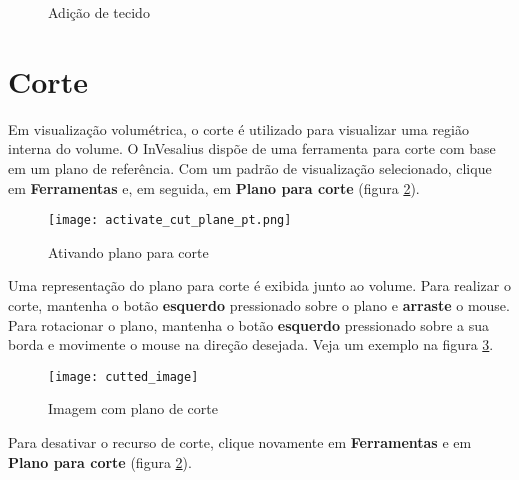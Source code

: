 \begin{figure}[!htb]
  \centering
  \hfill
  \hfill  
  \caption{Adição de tecido}
  \label{fig:raycasting_add}
\end{figure}

\newpage


\section{Corte}

Em visualização volumétrica, o corte é utilizado para visualizar uma região interna do volume.
O InVesalius dispõe de uma ferramenta para corte com base em um plano de referência. Com
um padrão de visualização selecionado, clique em \textbf{Ferramentas} e, em seguida, em
\textbf{Plano para corte} (figura \ref{fig:activate_cut_plane}).

\begin{figure}[!htb]
\centering
\texttt{[image: activate\_cut\_plane\_pt.png]}
\caption{Ativando plano para corte}
\label{fig:activate_cut_plane}
\end{figure}

Uma representação do plano para corte é exibida junto ao volume. Para realizar o corte,
mantenha o botão \textbf{esquerdo} pressionado sobre o plano e \textbf{arraste} o mouse.
Para rotacionar o plano, mantenha o botão \textbf{esquerdo} pressionado sobre a sua borda
e movimente o mouse na direção desejada. Veja um exemplo na figura \ref{fig:cutted_image}.

\begin{figure}[!htb]
\centering
\texttt{[image: cutted\_image]}
\caption{Imagem com plano de corte}
\label{fig:cutted_image}
\end{figure}

Para desativar o recurso de corte, clique novamente em \textbf{Ferramentas} e em
\textbf{Plano para corte} (figura \ref{fig:activate_cut_plane}).
